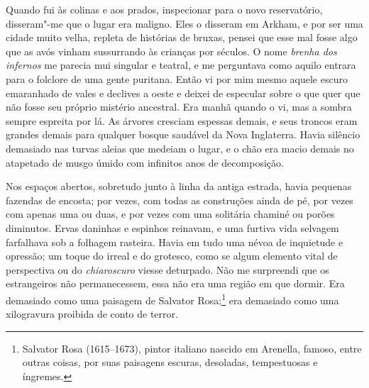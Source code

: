Quando fui às colinas e aos prados, inspecionar para o novo
reservatório, disseram"-me que o lugar era maligno. Eles o disseram em
Arkham, e por ser uma cidade muito velha, repleta de histórias de
bruxas, pensei que esse mal fosse algo que as avós vinham sussurrando às
crianças por séculos. O nome \textit{brenha dos infernos} me parecia mui
singular e teatral, e me perguntava como aquilo entrara para o folclore
de uma gente puritana. Então vi por mim mesmo aquele escuro emaranhado
de vales e declives a oeste e deixei de especular sobre o que quer que
não fosse seu próprio mistério ancestral. Era manhã quando o vi, mas a
sombra sempre espreita por lá. As árvores cresciam espessas demais, e
seus troncos eram grandes demais para qualquer bosque saudável da Nova
Inglaterra. Havia silêncio demasiado nas turvas aleias que medeiam o
lugar, e o chão era macio demais no atapetado de musgo úmido com
infinitos anos de decomposição.

Nos espaços abertos, sobretudo junto à linha da antiga estrada, havia
pequenas fazendas de encosta; por vezes, com todas as construções ainda
de pé, por vezes com apenas uma ou duas, e por vezes com uma solitária
chaminé ou porões diminutos. Ervas daninhas e espinhos reinavam, e uma
furtiva vida selvagem farfalhava sob a folhagem rasteira. Havia em tudo
uma névoa de inquietude e opressão; um toque do irreal e do grotesco,
como se algum elemento vital de perspectiva ou do \textit{chiaroscuro}
viesse deturpado. Não me surpreendi que os estrangeiros não
permanecessem, essa não era uma região em que dormir. Era demasiado como
uma paisagem de Salvator Rosa;\footnote{Salvator Rosa (1615--1673), pintor
  italiano nascido em Arenella, famoso, entre outras coisas, por suas
  paisagens escuras, desoladas, tempestuosas e íngremes.} era demasiado
como uma xilogravura proibida de conto de terror.

